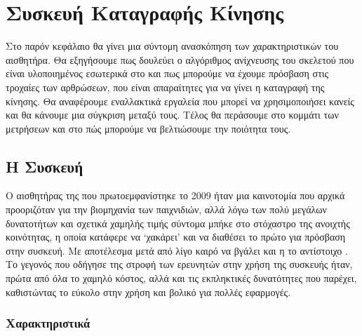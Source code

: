\chapter{Συσκευή Καταγραφής Κίνησης}

Στο παρόν κεφάλαιο θα γίνει μια σύντομη ανασκόπηση των χαρακτηριστικών του αισθητήρα. Θα εξηγήσουμε πως δουλεύει ο αλγόριθμος ανίχνευσης του σκελετού που είναι υλοποιημένος εσωτερικά στο  και πως μπορούμε να έχουμε πρόσβαση στις τροχαίες των αρθρώσεων, που είναι απαραίτητες για να γίνει η καταγραφή της κίνησης. Θα αναφέρουμε εναλλακτικά εργαλεία που μπορεί να χρησιμοποιήσει κανείς και θα κάνουμε μια σύγκριση μεταξύ τους. Τέλος θα περάσουμε στο κομμάτι των μετρήσεων και στο πώς μπορούμε να βελτιώσουμε την ποιότητα τους.

\section{\texorpdfstring{Η Συσκευή }{}}

Ο αισθητήρας της  που πρωτοεμφανίστηκε το 2009 ήταν μια καινοτομία που αρχικά προοριζόταν για την βιομηχανία των παιχνιδιών, αλλά λόγω των πολύ μεγάλων δυνατοτήτων και σχετικά χαμηλής τιμής σύντομα μπήκε στο στόχαστρο της ανοιχτής κοινότητας, η οποία κατάφερε να \lq χακάρει\rq \; και να διαθέσει το πρώτο  για πρόσβαση στην συσκευή. Με αποτέλεσμα μετά από λίγο καιρό να βγάλει και η  το αντίστοιχο . Το γεγονός που οδήγησε της στροφή των ερευνητών στην χρήση της συσκευής ήταν, πρώτα από όλα το χαμηλό κόστος, αλλά και τις εκπληκτικές δυνατότητες που παρέχει, καθιστώντας το εύκολο στην χρήση και βολικό για πολλές εφαρμογές.

\subsection{Χαρακτηριστικά}


